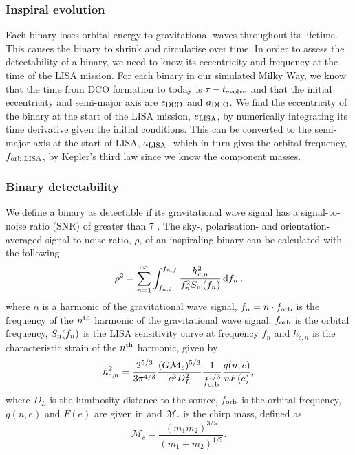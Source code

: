 \subsubsection{Inspiral evolution}

Each binary loses orbital energy to gravitational waves throughout its lifetime. This causes the binary to shrink and circularise over time. In order to assess the detectability of a binary, we need to know its eccentricity and frequency at the time of the LISA mission. For each binary in our simulated Milky Way, we know that the time from DCO formation to today is $\tau - t_{\rm evolve}$ and that the initial eccentricity and semi-major axis are $e_{\rm DCO}$ and $a_{\rm DCO}$. We find the eccentricity of the binary at the start of the LISA mission, $e_{\rm LISA}$, by numerically integrating its time derivative \citep[][Eq. 5.13]{Peters+1964} given the initial conditions. This can be converted to the semi-major axis at the start of LISA, $a_{\rm LISA} $\citep[][Eq. 5.11]{Peters+1964}, which in turn gives the orbital frequency, $f_{\rm orb, LISA}$, by Kepler's third law since we know the component masses.

\subsubsection{Binary detectability}

We define a binary as detectable if its gravitational wave signal has a signal-to-noise ratio (SNR) of greater than 7  \citep[e.g.][]{Breivik+2020, Korol+2020}. The sky-, polarisation- and orientation-averaged signal-to-noise ratio, $\rho$, of an inspiraling binary can be calculated with the following \citep[e.g.][]{Finn+2000}
\begin{equation}\label{eq:snr}
    \rho^2 = \sum_{n=1}^{\infty} \int_{f_{n, i}}^{f_{n, f}} \frac{h_{c, n}^{2}}{f_{n}^{2} S_{\rm n}\left(f_{n}\right)} \dd{f_n},
\end{equation}
where $n$ is a harmonic of the gravitational wave signal, $f_n = n \cdot f_{\rm orb}$ is the frequency of the $n^{\rm th}$ harmonic of the gravitational wave signal, $f_{\rm orb}$ is the orbital frequency, $S_{\rm n}(f_n)$ is the LISA sensitivity curve at frequency $f_n$ \citep[e.g.][]{Robson+2019} and $h_{c,n}$ is the characteristic strain of the $n^{\rm th}$ harmonic, given by \citep[e.g.][]{Barack+2004}
\begin{equation}\label{eq:charstrain}
    h^2_{c,n} = \frac{2^{5/3}}{3 \pi^{4/3}} \frac{(G \mathcal{M}_c)^{5/3}}{c^3 D_L^2} \frac{1}{f_{\rm orb}^{1/3}} \frac{g(n,e)}{n F(e)},
\end{equation}
where $D_L$ is the luminosity distance to the source, $f_{\rm orb}$ is the orbital frequency, $g(n, e)$ and $F(e)$ are given in \citet{Peters+1963} and $\mathcal{M}_c$ is the chirp mass, defined as
\begin{equation}\label{eq:chirp_mass}
    \mathcal{M}_c = \frac{(m_1 m_2)^{3/5}}{(m_1 + m_2)^{1/5}}.
\end{equation}

